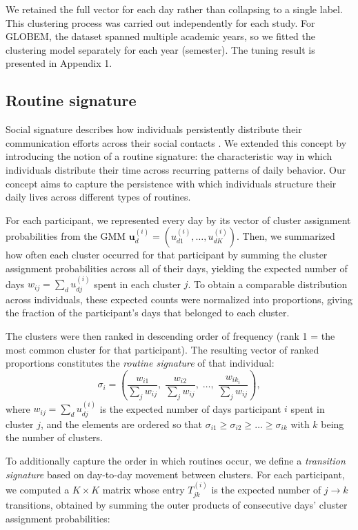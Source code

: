 \documentclass[pdflatex,sn-vancouver,Numbered]{bst/sn-jnl}%
\theoremstyle{thmstyleone}%
\theoremstyle{thmstyletwo}%
\theoremstyle{thmstylethree}%
\begin{document}
We retained the full vector for each day rather than collapsing to a single label. This clustering process was carried out independently for each study. For GLOBEM, the dataset spanned multiple academic years, so we fitted the clustering model separately for each year (semester). The tuning result is presented in Appendix 1.

\subsection*{Routine signature}\label{sec:methods:signature} 

Social signature describes how individuals persistently distribute their communication efforts across their social contacts \cite{saramaki2014persistence}. We extended this concept by introducing the notion of a routine signature: the characteristic way in which individuals distribute their time across recurring patterns of daily behavior. Our concept aims to capture the persistence with which individuals structure their daily lives across different types of routines.

For each participant, we represented every day by its vector of cluster assignment probabilities from the GMM $\mathbf{u}_d^{(i)} = (u_{d1}^{(i)}, \ldots, u_{dK}^{(i)})$. Then, we summarized how often each cluster occurred for that participant by summing the cluster assignment probabilities across all of their days, yielding the expected number of days $w_{ij} = \sum_d u_{dj}^{(i)}$ spent in each cluster $j$. To obtain a comparable distribution across individuals, these expected counts were normalized into proportions, giving the fraction of the participant's days that belonged to each cluster.

The clusters were then ranked in descending order of frequency (rank 1 = the most common cluster for that participant). The resulting vector of ranked proportions constitutes the \textit{routine signature} of that individual:
\begin{equation}
    \sigma_i = \left(
    \frac{w_{i1}}{\sum_j w_{ij}},\;
    \frac{w_{i2}}{\sum_j w_{ij}},\;
    \ldots,\;
    \frac{w_{ik_i}}{\sum_j w_{ij}}
    \right),
\end{equation}
where $w_{ij} = \sum_d u_{dj}^{(i)}$ is the expected number of days participant $i$ spent in cluster $j$, and the elements are ordered so that $\sigma_{i1} \geq \sigma_{i2} \geq \dots \geq \sigma_{ik}$ with $k$ being the number of clusters.

To additionally capture the order in which routines occur, we define a \textit{transition signature} based on day-to-day movement between clusters. For each participant, we computed a $K \times K$ matrix whose entry $T_{jk}^{(i)}$ is the expected number of $j \to k$ transitions, obtained by summing the outer products of consecutive days' cluster assignment probabilities:
\end{document}
